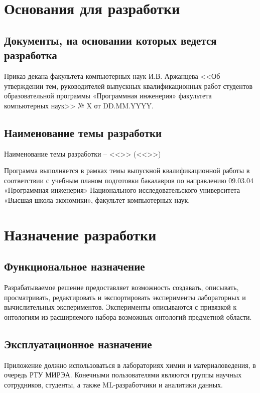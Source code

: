 \documentclass[a4paper,12pt,reqno]{article}
\begin{document}
    \section{Основания для разработки}

    \subsection{Документы, на основании которых ведется разработка}
    Приказ декана факультета компьютерных наук И.В. Аржанцева <<Об утверждении тем, руководителей выпускных квалификационных работ студентов образовательной программы «Программная инженерия» факультета компьютерных наук>> № X от DD.MM.YYYY.

    \subsection{Наименование темы разработки}
    Наименование темы разработки – <<\unskip>> (<<\unskip>>)

    Программа выполняется в рамках темы выпускной квалификационной работы в соответствии с учебным планом подготовки бакалавров по направлению 09.03.04 «Программная инженерия» Национального исследовательского университета «Высшая школа экономики», факультет компьютерных наук.
    \newpage


    \section{Назначение разработки}

    \subsection{Функциональное назначение}
    Разрабатываемое решение предоставляет возможность создавать, описывать, просматривать, редактировать и экспортировать эксперименты лабораторных и вычислительных экспериментов. Эксперименты описываются с привязкой к онтологиям из расширяемого набора возможных онтологий предметной области.

    \subsection{Эксплуатационное назначение}
    Приложение должно использоваться в лабораториях химии и материаловедения, в очередь РТУ МИРЭА. Конечными пользователями являются группы научных сотрудников, студенты, а также ML-разработчики и аналитики данных.
    \newpage
\end{document}
